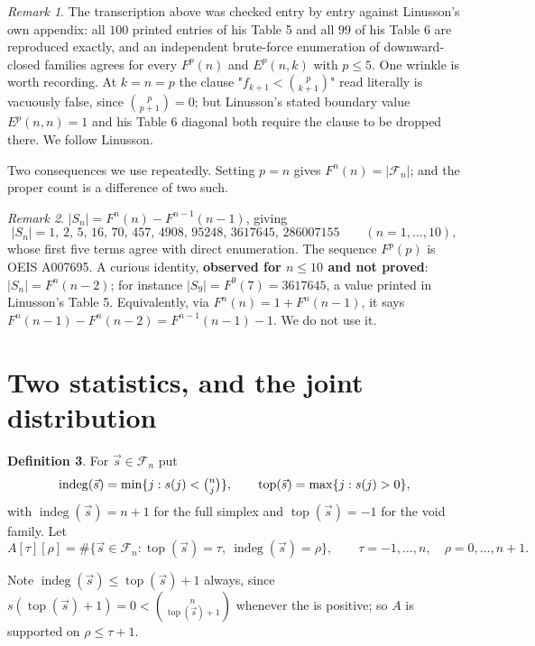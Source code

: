 \documentclass[11pt, a4paper, abstract=yes]{scrartcl}
\theoremstyle{definition}
\newtheorem{definition}{Definition}
\theoremstyle{remark}
\newtheorem{remark}[definition]{Remark}
\theoremstyle{plain}
\newcommand{\vek}[1]{\boldsymbol{#1}}
\newcommand{\indeg}{\operatorname{indeg}}
\newcommand{\tp}{\operatorname{top}}
\renewcommand{\vek}[1]{\vec{#1}}
\begin{document}
\begin{remark}
The transcription above was checked entry by entry against Linusson's own appendix: all \(100\)
printed entries of his Table 5 and all \(99\) of his Table 6 are reproduced exactly, and an
independent brute-force enumeration of downward-closed families agrees for every \(F^p(n)\) and
\(E^p(n,k)\) with \(p\le5\). One wrinkle is worth recording. At \(k=n=p\) the clause
"\(f_{k+1}<\binom p{k+1}\)" read literally is vacuously false, since \(\binom p{p+1}=0\); but
Linusson's stated boundary value \(E^p(n,n)=1\) and his Table 6 diagonal both require the clause to
be dropped there. We follow Linusson.
\label{org1660dbd}
\end{remark}

Two consequences we use repeatedly. Setting \(p=n\) gives \(F^n(n)=|\mathcal F_n|\); and the
proper count is a difference of two such.

\begin{remark}
\(|S_n|=F^n(n)-F^{n-1}(n-1)\), giving
\[
  \lvert S_n\rvert = 1,\,2,\,5,\,16,\,70,\,457,\,4908,\,95248,\,3617645,\,286007155
  \qquad(n=1,\dots,10),
\]
whose first five terms agree with direct enumeration. The sequence \(F^p(p)\) is
OEIS A007695. A curious identity, \textbf{observed for \(n\le10\) and not proved}: \(|S_n|=F^n(n-2)\); for
instance \(|S_9|=F^9(7)=3617645\), a value printed in Linusson's Table 5. Equivalently, via
\(F^n(n)=1+F^n(n-1)\), it says \(F^n(n-1)-F^n(n-2)=F^{n-1}(n-1)-1\). We do not use it.
\label{orgd3136f2}
\end{remark}
\section{Two statistics, and the joint distribution}
\label{sec:orgb4dc9d1}
\begin{definition}
For \(\vek s\in\mathcal F_n\) put
\[
  \indeg(\vek s)=\min\lbrace j:s(j)<\tbinom nj\rbrace,\qquad
  \tp(\vek s)=\max\lbrace j:s(j)>0\rbrace,
\]
with \(\indeg(\vek s)=n+1\) for the full simplex and \(\tp(\vek s)=-1\) for the void family. Let
\[
  A[\tau][\rho]=\#\lbrace \vek s\in\mathcal F_n:\tp(\vek s)=\tau,\ \indeg(\vek s)=\rho\rbrace,
  \qquad \tau=-1,\dots,n,\quad \rho=0,\dots,n+1 .
\]
\label{org33aa35f}
\end{definition}

Note \(\indeg(\vek s)\le\tp(\vek s)+1\) always, since \(s(\tp(\vek s)+1)=0<\binom n{\tp(\vek s)+1}\) whenever the
is positive; so \(A\) is supported on \(\rho\le\tau+1\).
\end{document}
